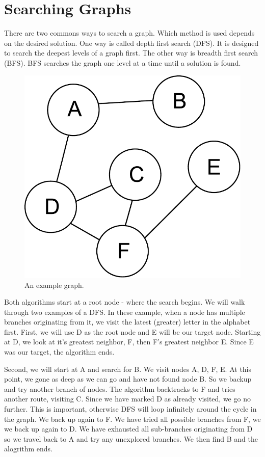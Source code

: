 \label{lab:SixDegreesKevinBacon}

\section*{Searching Graphs}
There are two commons ways to search a graph.
Which method is used depends on the desired solution.
One way is called depth first search (DFS).  It is designed to search the deepest levels of a graph first.
The other way is breadth first search (BFS).  BFS searches the graph one level at a time until a solution is found.
\begin{figure}[h]
\centering
\includegraphics[width=.5\textwidth]{graph.pdf}
\caption{An example graph.}
\label{fig:bfs_dfs_graph}
\end{figure}

Both algorithms start at a root node - where the search begins.
We will walk through two examples of a DFS.
In these example, when a node has multiple branches originating from it, we visit the latest (greater) letter in the alphabet first.
First, we will use D as the root node and E will be our target node.
Starting at D, we look at it's greatest neighbor, F, then F's greatest neighbor E.
Since E was our target, the algorithm ends.

Second, we will start at A and search for B. 
We visit nodes A, D, F, E.
At this point, we gone as deep as we can go and have not found node B.
So we backup and try another branch of nodes.
The algorithm backtracks to F and tries another route, visiting C.
Since we have marked D as already visited, we go no further.
This is important, otherwise DFS will loop infinitely around the cycle in the graph.
We back up again to F.  We have tried all possible branches from F, we we back up again to D.
We have exhausted all sub-branches originating from D so we travel back to A and try any unexplored branches.
We then find B and the alogrithm ends.

